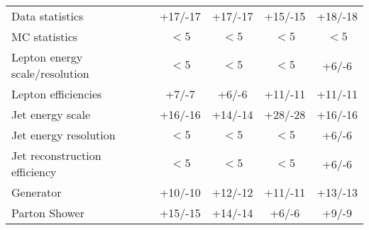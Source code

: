 \begin{table}[htdp]
\begin{center}
\begin{tabular}{l|c|c|c|c}
%
    Data statistics                   & +17/-17   & +17/-17  & +15/-15 & +18/-18 \\
    MC statistics                     & $<5$      & $<5$     & $<5$    & $<5$    \\
    \hline
    Lepton energy scale/resolution    & $<5$      & $<5$     & $<5$    & +6/-6    \\
    Lepton efficiencies               & +7/-7     & +6/-6    & +11/-11 & +11/-11  \\
    Jet energy scale                  & +16/-16   & +14/-14  & +28/-28 & +16/-16 \\
    Jet energy resolution             & $<5$      & $<5$     & $<5$    & +6/-6    \\
    Jet reconstruction efficiency     & $<5$      & $<5$     & $<5$    & +6/-6    \\

    Generator                         & +10/-10   & +12/-12  & +11/-11 & +13/-13   \\
    Parton Shower                     & +15/-15   & +14/-14  & +6/-6   & +9/-9 \\


\end{tabular}
\end{center}
\end{table}
